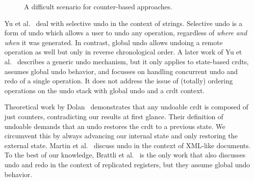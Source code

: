 \documentclass[sigplan,10pt]{acmart}
\begin{document}
\begin{figure}
\caption{
  A difficult scenario for counter-based approaches.
}\label{fig:anti-counter}
\end{figure}

Yu et al.~\cite{Yu2015undo} deal with selective undo in the context of strings.
Selective undo is a form of undo which allows a user to undo any operation,
regardless of \emph{where and when} it was generated.
In contrast, global undo allows undoing a remote operation as well
but only in reverse chronological order.
A later work of Yu et al.~\cite{Yu2019undo} describes a generic undo mechanism,
but it only applies to state-based \glspl*{crdt}, assumes global undo
behavior, and focusses on handling concurrent undo and redo of a single operation.
It does not address the issue of (totally) ordering operations on the undo stack
with global undo and a \gls{crdt} context.

Theoretical work by Dolan~\cite{Dolan2020undoable} demonstrates
that any undoable \gls{crdt} is composed of just counters, contradicting our
results at first glance.
Their definition of undoable demands that an undo restores the \gls{crdt}
to a previous state.
We circumvent this by always advancing our internal state and only restoring
the external state.
Martin et al.~\cite{Martin2010xml} discuss undo in the context of XML-like documents.
To the best of our knowledge, Brattli et al.~\cite{Brattli2021undo} is the
only work that also discusses undo and redo in the context of replicated registers,
but they assume global undo behavior.
\end{document}
